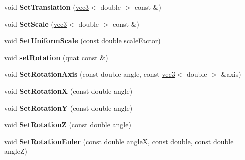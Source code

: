 \begin{DoxyCompactItemize}
\item 
\hypertarget{classmath_1_1mat33_a51778b9cced47776f78f408aeca59f2f}{
void {\bfseries SetTranslation} (\hyperlink{classmath_1_1vec3}{vec3}$<$ double $>$ const \&)}
\label{classmath_1_1mat33_a51778b9cced47776f78f408aeca59f2f}

\item 
\hypertarget{classmath_1_1mat33_a724dd051ba550b2fd534b1bf049d8ce9}{
void {\bfseries SetScale} (\hyperlink{classmath_1_1vec3}{vec3}$<$ double $>$ const \&)}
\label{classmath_1_1mat33_a724dd051ba550b2fd534b1bf049d8ce9}

\item 
\hypertarget{classmath_1_1mat33_aa88037571c69f1216ebafb0558269689}{
void {\bfseries SetUniformScale} (const double scaleFactor)}
\label{classmath_1_1mat33_aa88037571c69f1216ebafb0558269689}

\item 
\hypertarget{classmath_1_1mat33_a71a1821a3b774552fca810b4ad645258}{
void {\bfseries setRotation} (\hyperlink{classmath_1_1quat}{quat} const \&)}
\label{classmath_1_1mat33_a71a1821a3b774552fca810b4ad645258}

\item 
\hypertarget{classmath_1_1mat33_a32cc60ee1f88981fcade1f864bb0876c}{
void {\bfseries SetRotationAxis} (const double angle, const \hyperlink{classmath_1_1vec3}{vec3}$<$ double $>$ \&axis)}
\label{classmath_1_1mat33_a32cc60ee1f88981fcade1f864bb0876c}

\item 
\hypertarget{classmath_1_1mat33_a84e8401171377b65df945876d58ec827}{
void {\bfseries SetRotationX} (const double angle)}
\label{classmath_1_1mat33_a84e8401171377b65df945876d58ec827}

\item 
\hypertarget{classmath_1_1mat33_a21da886ff466bd5f4636893368cfb698}{
void {\bfseries SetRotationY} (const double angle)}
\label{classmath_1_1mat33_a21da886ff466bd5f4636893368cfb698}

\item 
\hypertarget{classmath_1_1mat33_af60df05ce322e741c338eb80f327de83}{
void {\bfseries SetRotationZ} (const double angle)}
\label{classmath_1_1mat33_af60df05ce322e741c338eb80f327de83}

\item 
\hypertarget{classmath_1_1mat33_a941af43c45ffd4b74643a0262563c3cd}{
void {\bfseries SetRotationEuler} (const double angleX, const double, const double angleZ)}
\label{classmath_1_1mat33_a941af43c45ffd4b74643a0262563c3cd}


\end{DoxyCompactItemize}
